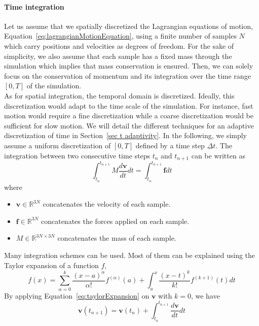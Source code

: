 \paragraph{Time integration}
Let us assume that we spatially discretized the Lagrangian equations of motion, Equation~\eqref{eq:lagrangianMotionEquation}, using a finite number of samples $N$ which carry positions and velocities as degrees of freedom.
For the sake of simplicity, we also assume that each sample has a fixed mass through the simulation which implies that mass conservation is ensured. Then, we can solely focus on the conservation of momentum and its integration over the time range  $\left[0, T\right]$ of the simulation. 
\\ 
As for spatial integration, the temporal domain is discretized. Ideally, this discretization would adapt to the time scale of the simulation. For instance, fast motion would require a fine discretization while a coarse discretization would be sufficient for slow motion. We will detail the different techniques for an adaptive discretization of time in Section~\ref{sec t adaptivity}.
In the following, we simply assume a uniform discretization of $\left[0,T\right]$ defined by a time step $\Delta t$. The integration between two consecutive time steps $t_{n}$ and $t_{n+1}$ can be written as
\begin{equation}
\label{eq:timeIntegration1}
\displaystyle
\int_{t_{n}}^{t_{n+1}}
M \frac{d\mathbf{v}}{dt} dt
=
\int_{t_{n}}^{t_{n+1}}\mathbf{f} dt
\end{equation}
where
\begin{itemize}
	\item $\mathbf{v} \in \mathbb{R}^{3N}$ concatenates the velocity of each sample.
	\item $\mathbf{f} \in \mathbb{R}^{3N}$ concatenates the forces applied on each sample.
	\item $M \in \mathbb{R}^{3N \times 3N}$ concatenates the mass of each sample.
\end{itemize}
Many integration schemes can be used. Most of them can be explained using the Taylor expansion of a function $f$,
\begin{equation}
\label{eq:taylorExpansion}
\displaystyle
f(x) = \sum_{\alpha=0}^{k}\frac{\left(x-a\right)^{\alpha}}{\alpha!}f^{(\alpha)}(a) + \int_{a}^{x}\frac{\left(x-t\right)^{k}}{k!}f^{(k+1)}(t)dt
\end{equation}
By applying Equation~\eqref{eq:taylorExpansion} on $\mathbf{v}$ with $k=0$, we have
\begin{equation}
\mathbf{v}(t_{n+1}) = \mathbf{v}(t_{n}) + \int_{t_{n}}^{t_{n+1}} \frac{d\mathbf{v}}{dt}dt
\end{equation}
